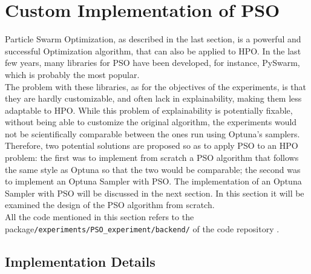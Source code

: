 \section{Custom Implementation of PSO}\label{sec:CustomImplementationOfPSO-3.2}

Particle Swarm Optimization, as described in the last section, is a powerful and successful Optimization algorithm, that can also be applied to HPO.
In the last few years, many libraries for PSO have been developed, for instance, PySwarm, which is probably the most popular.
\\[0.3cm]The problem with these libraries, as for the objectives of the experiments, is that they are hardly customizable, and often lack in explainability, making them less adaptable to HPO.
While this problem of explainability is potentially fixable, without being able to customize the original algorithm, the experiments would not be scientifically comparable between the ones run using Optuna's samplers.
\\[0.3cm]Therefore, two potential solutions are proposed so as to apply PSO to an HPO problem: the first was to implement from scratch a PSO algorithm that follows the same style as Optuna so that the two would be comparable; the second was to implement an Optuna Sampler with PSO.
The implementation of an Optuna Sampler with PSO will be discussed in the next section. In this section it will be examined the design of the PSO algorithm from scratch.
\\[0.3cm]All the code mentioned in this section refers to the package\newline\texttt{/experiments/PSO\_experiment/backend/} of the code repository \cite{Repository-THESIS}.

\subsection{Implementation Details}

